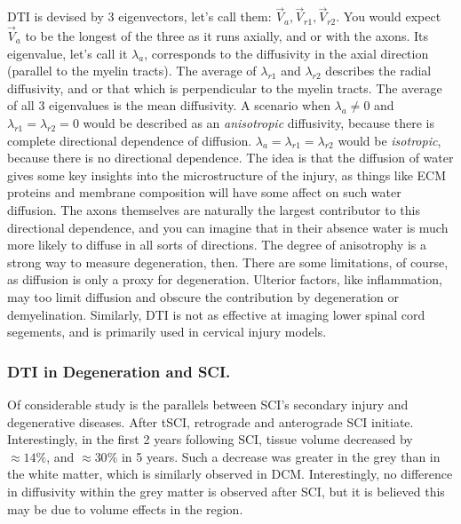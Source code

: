 DTI is devised by 3 eigenvectors, let's call them: $\vec{V}_{a}, \vec{V}_{r1}, \vec{V}_{r2}$. You would expect $\vec{V}_{a}$ to be the longest of the three as it runs axially, and or with the axons. Its eigenvalue, let's call it $\lambda_a$, corresponds to the diffusivity in the axial direction (parallel to the myelin tracts). The average of $\lambda_{r1}$ and $\lambda_{r2}$ describes the radial diffusivity, and or that which is perpendicular to the myelin tracts. The average of all 3 eigenvalues is the mean diffusivity. A scenario when $\lambda_a \neq 0$ and $\lambda_{r1} = \lambda_{r2} = 0$ would be described as an \textit{anisotropic} diffusivity, because there is complete directional dependence of diffusion. $\lambda_a = \lambda_{r1} = \lambda_{r2}$ would be \textit{isotropic}, because there is no directional dependence. The idea is that the diffusion of water gives some key insights into the microstructure of the injury, as things like ECM proteins and membrane composition will have some affect on such water diffusion. The axons themselves are naturally the largest contributor to this directional dependence, and you can imagine that in their absence water is much more likely to diffuse in all sorts of directions. The degree of anisotrophy is a strong way to measure degeneration, then. There are some limitations, of course, as diffusion is only a proxy for degeneration. Ulterior factors, like inflammation, may too limit diffusion and obscure the contribution by degeneration or demyelination. Similarly, DTI is not as effective at imaging lower spinal cord segements, and is primarily used in cervical injury models.

\subsubsection{DTI in Degeneration and SCI.}

Of considerable study is the parallels between SCI's secondary injury and degenerative diseases. After tSCI, retrograde and anterograde SCI initiate. Interestingly, in the first 2 years following SCI, tissue volume decreased by $\approx 14\%$, and $\approx 30\%$ in 5 years. Such a decrease was greater in the grey than in the white matter, which is similarly observed in DCM. Interestingly, no difference in diffusivity within the grey matter is observed after SCI, but it is believed this may be due to volume effects in the region.\newline

